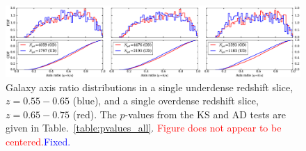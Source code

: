 \documentclass[twocolumn,useAMS,usenatbib]{mn2e}
\newcommand{\rachel}[1]{{\textcolor{red}{#1}}}
\newcommand{\arun}[1]{{\textcolor{blue}{#1}}}
\begin{document}
\begin{figure}
 \centering
 \includegraphics[width=2.2\columnwidth]{axis_ratio_odud}
 \caption{Galaxy axis ratio distributions in a single underdense redshift
   slice, $z=0.55-0.65$ (blue), and a single overdense redshift slice,
   $z=0.65-0.75$ (red). The $p$-values from the
   KS and AD tests are given in Table.~\ref{table:pvalues_all}.   \rachel{Figure does not appear to
     be centered.}\arun{Fixed.}}
 \label{fig:axisratio_contrasting}
\end{figure}
\end{document}
